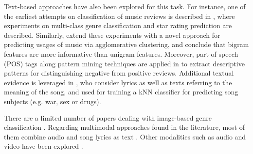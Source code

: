 Text-based approaches have also been explored for this task. For instance, one of the earliest attempts on classification of music reviews is described in \citep{Hu2005}, where experiments on multi-class genre classification and star rating prediction are described. Similarly, \citep{Hu2006} extend these experiments with a novel approach for predicting usages of music via agglomerative clustering, and conclude that bigram features are more informative than unigram features. 
Moreover, part-of-speech (POS) tags along pattern mining techniques are applied in \citep{Downie2006} to extract descriptive patterns for distinguishing negative from positive reviews. Additional textual evidence is leveraged in \citep{Choi2014}, who consider lyrics as well as texts referring to the meaning of the song, and used for training a kNN classifier for predicting song subjects (e.g. war, sex or drugs).

There are a limited number of papers dealing with image-based genre classification \citep{libeks2011you}.
Regarding multimodal approaches found in the literature, most of them combine audio and song lyrics as text \citep{laurier2008multimodal,neumayer2007integration}. Other modalities such as audio and video have been explored \citep{schindler2015audio}. 


